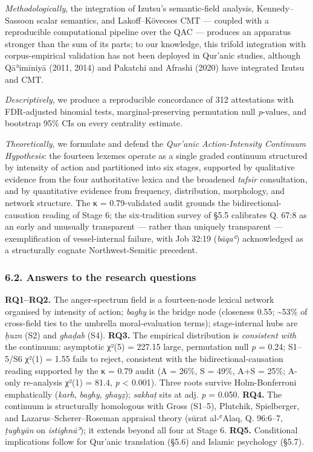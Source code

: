 \documentclass[11pt,a4paper]{article}
\begin{document}
\emph{Methodologically}, the integration of Izutsu's semantic-field
analysis, Kennedy--Sassoon scalar semantics, and Lakoff--Kövecses CMT
--- coupled with a reproducible computational pipeline over the QAC ---
produces an apparatus stronger than the sum of its parts; to our
knowledge, this trifold integration with corpus-empirical validation has
not been deployed in Qur'anic studies, although Qāʾimīniyā (2011, 2014)
and Pakatchi and Afrashi (2020) have integrated Izutsu and CMT.

\emph{Descriptively}, we produce a reproducible concordance of 312
attestations with FDR-adjusted binomial tests, marginal-preserving
permutation null \emph{p}-values, and bootstrap 95\% CIs on every
centrality estimate.

\emph{Theoretically}, we formulate and defend the \emph{Qur'anic
Action-Intensity Continuum Hypothesis}: the fourteen lexemes operate as
a single graded continuum structured by intensity of action and
partitioned into six stages, supported by qualitative evidence from the
four authoritative lexica and the broadened \emph{tafsīr} consultation,
and by quantitative evidence from frequency, distribution, morphology,
and network structure. The κ = 0.79-validated audit grounds the
bidirectional-causation reading of Stage 6; the six-tradition survey of
§5.5 calibrates Q. 67:8 as an early and unusually transparent --- rather
than uniquely transparent --- exemplification of vessel-internal
failure, with Job 32:19 (\emph{bāqaʿ}) acknowledged as a structurally
cognate Northwest-Semitic precedent.

\subsubsection{6.2. Answers to the research
questions}\label{answers-to-the-research-questions}

\textbf{RQ1--RQ2.} The anger-spectrum field is a fourteen-node lexical
network organised by intensity of action; \emph{baghy} is the bridge
node (closeness 0.55; \textasciitilde53\% of cross-field ties to the
umbrella moral-evaluation terms); stage-internal hubs are \emph{ḥuzn}
(S2) and \emph{ghaḍab} (S4). \textbf{RQ3.} The empirical distribution is
\emph{consistent with} the continuum: asymptotic χ²(5) = 227.15 large,
permutation null \emph{p} = 0.24; S1--5/S6 χ²(1) = 1.55 fails to reject,
consistent with the bidirectional-causation reading supported by the κ =
0.79 audit (A = 26\%, S = 49\%, A+S = 25\%; A-only re-analysis χ²(1) =
81.4, \emph{p} \textless{} 0.001). Three roots survive Holm-Bonferroni
emphatically (\emph{karh}, \emph{baghy}, \emph{ghayẓ}); \emph{sakhaṭ}
sits at adj. \emph{p} = 0.050. \textbf{RQ4.} The continuum is
structurally homologous with Gross (S1--5), Plutchik, Spielberger, and
Lazarus--Scherer--Roseman appraisal theory (sūrat al-ʿAlaq, Q. 96:6--7,
\emph{ṭughyān} on \emph{istighnāʾ}); it extends beyond all four at Stage
6. \textbf{RQ5.} Conditional implications follow for Qur'anic
translation (§5.6) and Islamic psychology (§5.7).
\end{document}
